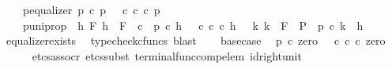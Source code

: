 \begin{isabellebody}
\ \ \ \ p{\isacharprime}{\kern0pt}{\isacharunderscore}{\kern0pt}equalizer{\isacharcolon}{\kern0pt}\ {\isachardoublequoteopen}p\ {\isasymcirc}\isactrlsub c\ p{\isacharprime}{\kern0pt}\ {\isacharequal}{\kern0pt}\ {\isacharparenleft}{\kern0pt}{\isasymt}\ {\isasymcirc}\isactrlsub c\ {\isasymbeta}\isactrlbsub {\isasymnat}\isactrlsub c\isactrlesub {\isacharparenright}{\kern0pt}\ {\isasymcirc}\isactrlsub c\ p{\isacharprime}{\kern0pt}{\isachardoublequoteclose}\ \isanewline
\ \ \ \ p{\isacharprime}{\kern0pt}{\isacharunderscore}{\kern0pt}uni{\isacharunderscore}{\kern0pt}prop{\isacharcolon}{\kern0pt}\ {\isachardoublequoteopen}{\isasymforall}\ h\ F{\isachardot}{\kern0pt}\ {\isacharparenleft}{\kern0pt}{\isacharparenleft}{\kern0pt}h\ {\isacharcolon}{\kern0pt}\ F\ {\isasymrightarrow}\ {\isasymnat}\isactrlsub c{\isacharparenright}{\kern0pt}\ {\isasymand}\ {\isacharparenleft}{\kern0pt}p\ {\isasymcirc}\isactrlsub c\ h\ {\isacharequal}{\kern0pt}\ {\isacharparenleft}{\kern0pt}{\isasymt}\ {\isasymcirc}\isactrlsub c\ {\isasymbeta}\isactrlbsub {\isasymnat}\isactrlsub c\isactrlesub {\isacharparenright}{\kern0pt}\ {\isasymcirc}\isactrlsub c\ h{\isacharparenright}{\kern0pt}{\isacharparenright}{\kern0pt}\ {\isasymlongrightarrow}\ {\isacharparenleft}{\kern0pt}{\isasymexists}{\isacharbang}{\kern0pt}\ k{\isachardot}{\kern0pt}\ {\isacharparenleft}{\kern0pt}k\ {\isacharcolon}{\kern0pt}\ F\ {\isasymrightarrow}\ P{\isacharparenright}{\kern0pt}\ {\isasymand}\ p{\isacharprime}{\kern0pt}\ {\isasymcirc}\isactrlsub c\ k\ {\isacharequal}{\kern0pt}\ h{\isacharparenright}{\kern0pt}{\isachardoublequoteclose}\isanewline
\ \ \ \ \isamarkupfalse%
\ equalizer{\isacharunderscore}{\kern0pt}exists{}\ \isamarkupfalse%
\ {\isacharparenleft}{\kern0pt}typecheck{\isacharunderscore}{\kern0pt}cfuncs{\isacharcomma}{\kern0pt}\ blast{\isacharparenright}{\kern0pt}\isanewline
\isanewline
\ \ \isamarkupfalse%
\ base{\isacharunderscore}{\kern0pt}case\ \isamarkupfalse%
\ {\isachardoublequoteopen}p\ {\isasymcirc}\isactrlsub c\ zero\ {\isacharequal}{\kern0pt}\ {\isacharparenleft}{\kern0pt}{\isasymt}\ {\isasymcirc}\isactrlsub c\ {\isasymbeta}\isactrlbsub {\isasymnat}\isactrlsub c\isactrlesub {\isacharparenright}{\kern0pt}\ {\isasymcirc}\isactrlsub c\ zero{\isachardoublequoteclose}\isanewline
\ \ \ \ \isamarkupfalse%
\ {\isacharparenleft}{\kern0pt}etcs{\isacharunderscore}{\kern0pt}assocr{\isacharcomma}{\kern0pt}\ etcs{\isacharunderscore}{\kern0pt}subst\ terminal{\isacharunderscore}{\kern0pt}func{\isacharunderscore}{\kern0pt}comp{\isacharunderscore}{\kern0pt}elem\ id{\isacharunderscore}{\kern0pt}right{\isacharunderscore}{\kern0pt}unit{}{\isacharcomma}{\kern0pt}\ {\isacharminus}{\kern0pt}{\isacharparenright}{\kern0pt}\isanewline

\end{isabellebody}
